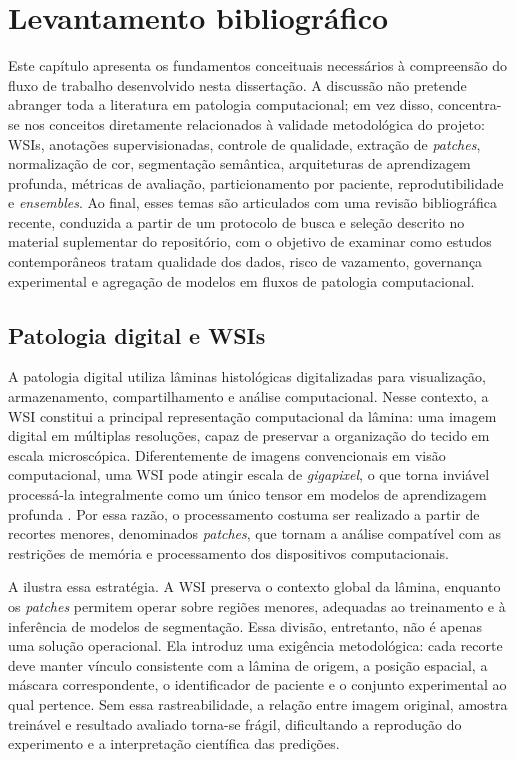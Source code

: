 \chapter{Levantamento bibliográfico}\label{chp:levantamento}

Este capítulo apresenta os fundamentos conceituais necessários à compreensão do
fluxo de trabalho desenvolvido nesta dissertação. A discussão não pretende
abranger toda a literatura em patologia computacional; em vez disso, concentra-se
nos conceitos diretamente relacionados à validade metodológica do projeto:
WSIs, anotações supervisionadas, controle de qualidade, extração de
\textit{patches}, normalização de cor, segmentação semântica, arquiteturas de
aprendizagem profunda, métricas de avaliação, particionamento por paciente,
reprodutibilidade e \textit{ensembles}. Ao final, esses temas são articulados
com uma revisão bibliográfica recente, conduzida a partir de um protocolo de
busca e seleção descrito no material suplementar do repositório, com o objetivo
de examinar como estudos contemporâneos tratam qualidade dos dados, risco de
vazamento, governança experimental e agregação de modelos em fluxos de patologia
computacional.

\section{Patologia digital e WSIs}\label{sec:patologia_digital_wsi}

A patologia digital utiliza lâminas histológicas digitalizadas para visualização,
armazenamento, compartilhamento e análise computacional. Nesse contexto, a
WSI constitui a principal representação
computacional da lâmina: uma imagem digital em múltiplas resoluções, capaz de
preservar a organização do tecido em escala microscópica. Diferentemente de
imagens convencionais em visão computacional, uma WSI pode atingir escala de
\textit{gigapixel}, o que torna inviável processá-la integralmente como um único
tensor em modelos de aprendizagem profunda \cite{khened2021generalized,
munozaguirre2020pyhist}. Por essa razão, o processamento costuma ser realizado a
partir de recortes menores, denominados \textit{patches}, que tornam a análise
compatível com as restrições de memória e processamento dos dispositivos
computacionais.

A  ilustra essa estratégia. A WSI preserva o contexto
global da lâmina, enquanto os \textit{patches} permitem operar sobre regiões
menores, adequadas ao treinamento e à inferência de modelos de segmentação. Essa
divisão, entretanto, não é apenas uma solução operacional. Ela introduz uma
exigência metodológica: cada recorte deve manter vínculo consistente com a
lâmina de origem, a posição espacial, a máscara correspondente, o identificador
de paciente e o conjunto experimental ao qual pertence. Sem essa rastreabilidade,
a relação entre imagem original, amostra treinável e resultado avaliado torna-se
frágil, dificultando a reprodução do experimento e a interpretação científica das
predições.

